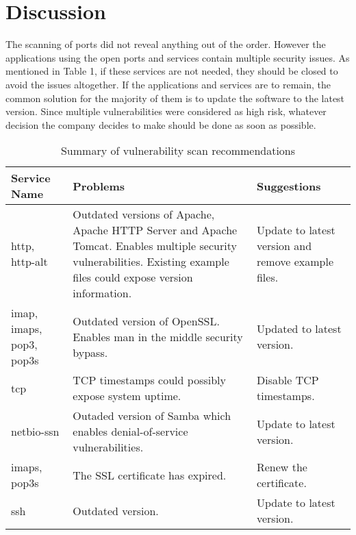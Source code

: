 \section{Discussion} \label{sec:discussion}

The scanning of ports did not reveal anything out of the order. However the applications using the open ports and services contain multiple security issues. As mentioned in Table 1, if these services are not needed, they should be closed to avoid the issues altogether. If the applications and services are to remain, the common solution for the majority of them is to update the software to the latest version. Since multiple vulnerabilities were considered as high risk, whatever decision the company decides to make should be done as soon as possible. 
\begin{table}[htb]
 \centering
 \caption{Summary of vulnerability scan recommendations} 
 \label{tab:recommendations}
 \begin{tabular}{m{2cm}p{4cm}p{7cm}} \toprule
 \textbf{Service Name} & \textbf{Problems} & \textbf{Suggestions} \\ \midrule
 http, http-alt 	& Outdated versions of Apache, Apache HTTP Server and Apache Tomcat. Enables multiple security vulnerabilities. Existing example files could expose version information. & Update to latest version and remove example files. \\
 imap, imaps, pop3, pop3s & Outdated version of OpenSSL. Enables man in the middle security bypass. & Updated to latest version. \\
 tcp & TCP timestamps could possibly expose system uptime. & Disable TCP timestamps. \\
 netbio-ssn & Outaded version of Samba which enables denial-of-service vulnerabilities. & Update to latest version. \\
 imaps, pop3s & The SSL certificate has expired. & Renew the certificate. \\ 
 ssh & Outdated version. & Update to latest version. \\ \bottomrule
 \end{tabular} 
\end{table}

